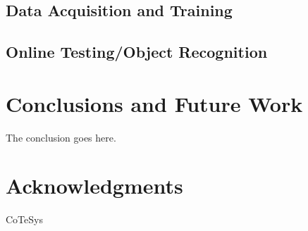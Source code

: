 \documentclass[conference]{sty/IEEEtran}
\begin{document}
\subsection{Data Acquisition and Training}
\subsection{Online Testing/Object Recognition}


\section{Conclusions and Future Work} 
The conclusion goes here.

\section*{Acknowledgments}
CoTeSys



\end{document}
